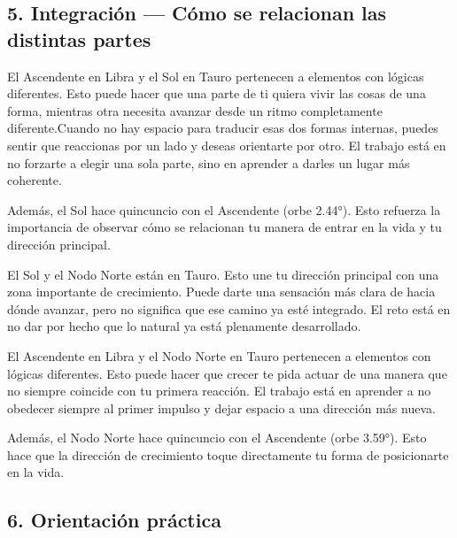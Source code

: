 \documentclass[11pt,a4paper]{article}
\begin{document}
\vspace{0.5cm}


\subsection{5. Integración — Cómo se relacionan las distintas partes}

El Ascendente en Libra y el Sol en Tauro pertenecen a elementos con lógicas diferentes. Esto puede hacer que una parte de ti quiera vivir las cosas de una forma, mientras otra necesita avanzar desde un ritmo completamente diferente.Cuando no hay espacio para traducir esas dos formas internas, puedes sentir que reaccionas por un lado y deseas orientarte por otro. El trabajo está en no forzarte a elegir una sola parte, sino en aprender a darles un lugar más coherente.

Además, el Sol hace quincuncio con el Ascendente (orbe 2.44°). Esto refuerza la importancia de observar cómo se relacionan tu manera de entrar en la vida y tu dirección principal.

El Sol y el Nodo Norte están en Tauro. Esto une tu dirección principal con una zona importante de crecimiento. Puede darte una sensación más clara de hacia dónde avanzar, pero no significa que ese camino ya esté integrado. El reto está en no dar por hecho que lo natural ya está plenamente desarrollado.

El Ascendente en Libra y el Nodo Norte en Tauro pertenecen a elementos con lógicas diferentes. Esto puede hacer que crecer te pida actuar de una manera que no siempre coincide con tu primera reacción. El trabajo está en aprender a no obedecer siempre al primer impulso y dejar espacio a una dirección más nueva.

Además, el Nodo Norte hace quincuncio con el Ascendente (orbe 3.59°). Esto hace que la dirección de crecimiento toque directamente tu forma de posicionarte en la vida.

\vspace{0.5cm}


\subsection{6. Orientación práctica}
\end{document}
